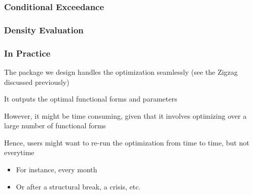 \documentclass{beamer}
\newenvironment{wideitemize}{\itemize\addtolength{\itemsep}{10pt}}{\enditemize}
\begin{document}
\begin{frame}
  \frametitle{Conditional Exceedance}
\end{frame}

     
\begin{frame}
  \frametitle{Density Evaluation}
\end{frame}


\begin{frame}
  \frametitle{In Practice}
  \begin{wideitemize}
    \item The package we design handles the optimization seamlessly (see the Zigzag discussed previously)
    \item It outputs the optimal functional forms and parameters
    \item However, it might be time consuming, given that it involves optimizing over a large number of functional forms
    \item Hence, users might want to re-run the optimization from time to time, but not everytime
      \begin{itemize}
      \item For instance, every month
      \item Or after a structural break, a crisis, etc.
      \end{itemize}
  \end{wideitemize}
\end{frame}
\end{document}
